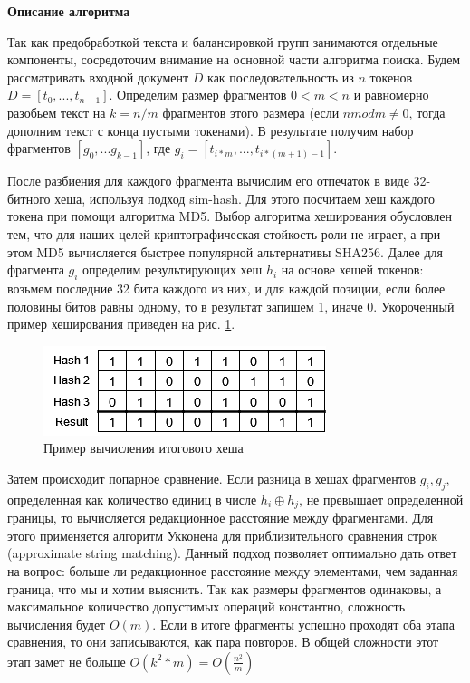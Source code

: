 \documentclass[14pt]{matmex-diploma-custom}
\begin{document}
\textbf{Описание алгоритма}

Так как предобработкой текста и балансировкой групп занимаются отдельные компоненты, сосредоточим внимание на основной части алгоритма поиска. Будем рассматривать входной документ $D$ как последовательность из $n$ токенов $D = [t_0,...,t_{n-1}]$. Определим размер фрагментов $0 < m < n$ и равномерно разобьем текст на $k = n / m$ фрагментов этого размера (если $n mod m \ne 0$, тогда дополним текст с конца пустыми токенами). В результате получим набор фрагментов $[g_0,...g_{k-1}]$, где $g_i = [t_{i * m},...,t_{i * (m + 1) - 1}]$. 

После разбиения для каждого фрагмента вычислим его отпечаток в виде 32-битного хеша, используя подход sim-hash\cite{bib:art:SimHash}. Для этого посчитаем хеш каждого токена при помощи алгоритма MD5\cite{bib:art:MD5}. Выбор алгоритма хеширования обусловлен тем, что для наших целей криптографическая стойкость роли не играет, а при этом MD5 вычисляется быстрее популярной альтернативы SHA256\cite{bib:art:MD5vsSHA256}. Далее для фрагмента $g_i$ определим результирующих хеш $h_i$ на основе хешей токенов: возьмем последние 32 бита каждого из них, и для каждой позиции, если более половины битов равны одному, то в результат запишем 1, иначе 0. Укороченный пример хеширования приведен на рис. \ref{fig:Hashing}.

\begin{figure}[h!]
	\includegraphics[scale=1]{pictures/Hash.png}
	\centering
	\caption{Пример вычисления итогового хеша}
	\label{fig:Hashing}
\end{figure}

Затем происходит попарное сравнение. Если разница в хешах фрагментов $g_i, g_j$, определенная как количество единиц в числе $h_i \oplus h_j$, не превышает определенной границы, то вычисляется редакционное расстояние между фрагментами. Для этого применяется алгоритм Укконена \cite{bib:art:UkkonenASM} для приблизительного сравнения строк (approximate string matching). Данный подход позволяет оптимально дать ответ на вопрос: больше ли редакционное расстояние между элементами, чем заданная граница, что мы и хотим выяснить. Так как размеры фрагментов одинаковы, а максимальное количество допустимых операций константно, сложность вычисления будет $O(m)$. Если в итоге фрагменты успешно проходят оба этапа сравнения, то они записываются, как пара повторов. В общей сложности этот этап замет не больше $O(k^2 * m) = O(\frac{n^2}{m})$
\end{document}
